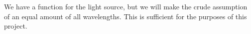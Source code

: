 We have a function for the light source, but we will make the crude assumption of an equal amount of all wavelengths. This is sufficient for the purposes of this project.










